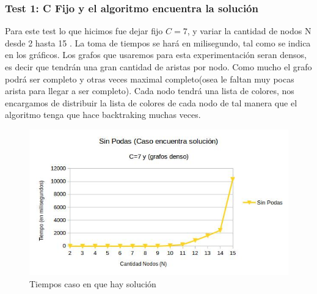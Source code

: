 \vspace*{0.3cm}
\subsubsection{Test 1: C Fijo y el algoritmo encuentra la solución}


Para este test lo que hicimos fue dejar fijo $C = 7$, y variar la cantidad de nodos N desde 2 hasta 15 .\newline
La toma de tiempos se hará en milisegundo, tal como se indica en los gráficos. \newline
Los grafos que usaremos para esta experimentación seran densos, es decir que tendrán una gran cantidad de aristas por nodo. Como mucho el grafo podrá ser completo y otras veces maximal completo(osea le faltan muy pocas arista para llegar a ser completo).
Cada nodo tendrá una lista de colores, nos encargamos de distribuir la lista de colores de cada nodo de tal manera que el algoritmo tenga que hace backtraking  muchas veces.

\begin{figure}[htb]
  \begin{center}
      \includegraphics[scale=0.60]{imagenes/imgEjercicio2/SinPodas-solucion}
  \end{center}
  \caption{Tiempos caso en que hay solución}
\end{figure}

